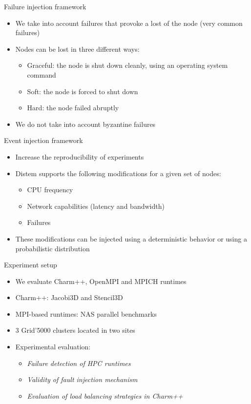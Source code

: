 \documentclass[11pt,xcolor=dvipsnames,presentation]{beamer}
\begin{document}
\begin{frame}[label=sec-4-0-6]{Failure injection framework}

\begin{itemize}
\item We take into account failures that provoke a lost of the node (very common failures)

\item Nodes can be lost in three different ways:

\begin{itemize}
\item \alert{Graceful}: the node is shut down cleanly, using an operating system command
\item \alert{Soft}: the node is forced to shut down
\item \alert{Hard}: the node failed abruptly
\end{itemize}

\item We do not take into account byzantine failures
\end{itemize}
\end{frame}

\begin{frame}[label=sec-4-0-7]{Event injection framework}
\begin{itemize}
\item Increase the reproducibility of experiments
\item Distem supports the following modifications for a given set of nodes:
\begin{itemize}
\item CPU frequency
\item Network capabilities (latency and bandwidth)
\item Failures
\end{itemize}
\item These modifications can be injected using a deterministic behavior or using
a probabilistic distribution
\end{itemize}
\end{frame}

\begin{frame}[label=sec-4-0-8]{Experiment setup}
\begin{itemize}
\item We evaluate Charm++, OpenMPI and MPICH runtimes
\item Charm++: Jacobi3D and Stencil3D
\item MPI-based runtimes:  NAS parallel benchmarks

\item 3 Grid'5000 clusters located in two sites

\item Experimental evaluation:
\begin{itemize}
\item \emph{Failure detection of HPC runtimes}
\item \emph{Validity of fault injection mechanism}
\item \emph{Evaluation of load balancing strategies in Charm++}
\end{itemize}
\end{itemize}
\end{frame}
\end{document}
